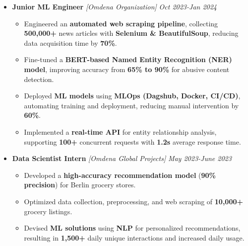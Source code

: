 \documentclass[a4paper,10pt]{article}
\begin{document}
\begin{itemize}

\vspace{-1mm}
\item {\bf Junior ML Engineer } \textit{[Omdena Organization]}
\textit{\hfill 
{Oct 2023-Jan 2024}
}
\vspace{-1mm}

\begin{itemize}

\item Engineered an \textbf{automated web scraping pipeline}, collecting \textbf{500,000+} news articles with \textbf{Selenium \& BeautifulSoup}, reducing data acquisition time by \textbf{70\%}.

\item Fine-tuned a \textbf{BERT-based Named Entity Recognition (NER) model}, improving accuracy from \textbf{65\% to 90\%} for abusive content detection.

\item Deployed \textbf{ML models} using \textbf{MLOps (Dagshub, Docker, CI/CD)}, automating training and deployment, reducing manual intervention by \textbf{60\%}.

\item Implemented a \textbf{real-time API} for entity relationship analysis, supporting \textbf{100+} concurrent requests with \textbf{1.2s} average response time.

\vspace{-1mm}

\end{itemize}
\end{itemize}



\begin{itemize}

\vspace{-0.5mm}
\item {\bf Data Scientist Intern } \textit{[Omdena Global Projects]}
\textit{\hfill 
{May 2023-June 2023}
}
\vspace{-1mm}

\begin{itemize}

\item Developed a \textbf{high-accuracy recommendation model} (\textbf{90\% precision}) for Berlin grocery stores.

\item Optimized data collection, preprocessing, and web scraping of \textbf{10,000+} grocery listings.

\item Devised \textbf{ML solutions} using \textbf{NLP} for personalized recommendations, resulting in \textbf{1,500+} daily unique interactions and increased daily usage.

\vspace{-1mm}

\end{itemize}
\end{itemize}
\end{document}
